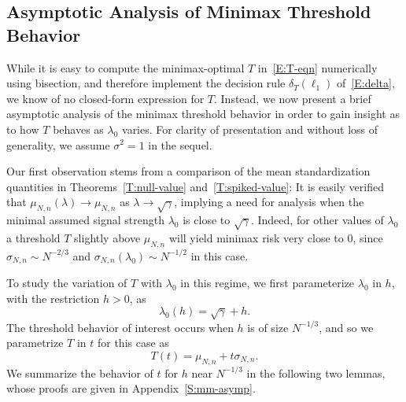 \documentclass[final]{IEEEtran}
\newcommand{\ulambda}{\lambda_0}
\begin{document}
\subsection{Asymptotic Analysis of Minimax Threshold Behavior}

While it is easy to compute the minimax-optimal $T$ in~\eqref{E:T-eqn} numerically using bisection, and therefore implement the decision rule $\delta_T( \ell_1 )$ of~\eqref{E:delta}, we know of no closed-form expression for $T$.  Instead, we now present a brief asymptotic analysis of the minimax threshold behavior in order to gain insight as to how $T$ behaves as $\ulambda$ varies.  For clarity of presentation and without loss of generality, we assume $\sigma^2 = 1$ in the sequel.

Our first observation stems from a comparison of the mean standardization quantities in Theorems~\ref{T:null-value} and~\ref{T:spiked-value}: It is easily verified that $\mu_{N,n}(\lambda) \to \mu_{N,n}$ as
$\lambda \to \sqrt{\gamma}$, implying a need for analysis when
the minimal assumed signal strength $\ulambda$ is close to $\sqrt{\gamma}$.
Indeed, for other values of $\ulambda$ a threshold $T$ slightly above $\mu_{N,n}$ will yield minimax risk very close to $0$, since $\sigma_{N,n} \sim N^{-2/3}$ and $\sigma_{N,n}(\ulambda) \sim N^{-1/2}$ in this case.

To study the variation of $T$ with $\ulambda$ in this regime, we first parameterize $\ulambda$ in $h$, with the restriction $h > 0$, as
\begin{equation}\label{E:Lh}
    \ulambda(h) = \sqrt{ \gamma } + h.
\end{equation}
The threshold behavior of interest occurs when $h$ is of size $N^{-1/3}$, and so we parametrize $T$ in $t$ for this case as
\begin{equation}\label{E:Tt}
    T(t) = \mu_{N,n} + t \sigma_{N,n}.
\end{equation}
We summarize the behavior of $t$ for $h$ near $N^{-1/3}$ in the following two lemmas, whose proofs are given in Appendix~\ref{S:mm-asymp}.
\end{document}
